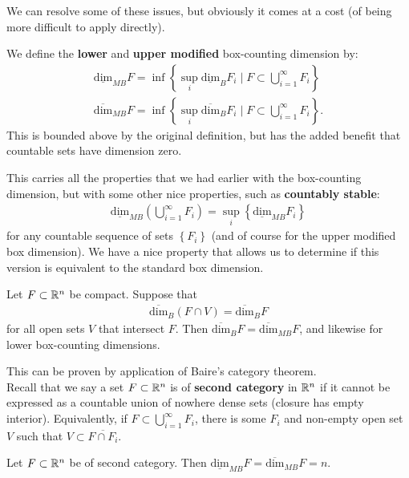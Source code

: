 \documentclass{memoir}
\begin{document}
We can resolve some of these issues, but obviously it comes at a cost (of being more difficult to apply directly).
\begin{defn}
	We define the \textbf{lower} and \textbf{upper modified} box-counting dimension by:
	\begin{align*}
		\underline{ \textrm{dim}}_{MB}F = \inf \left\{ \sup_{i} \underline{ \textrm{dim}}_B F_i \mid F\subset \bigcup_{i =1}^{\infty}F_i \right\} \\
		\overline{ \textrm{dim}}_{MB}F = \inf \left\{ \sup_{i} \overline{ \textrm{dim}}_B F_i \mid F \subset \bigcup_{i=1}^{\infty}F_i \right\} .
	\end{align*}
	This is bounded above by the original definition, but has the added benefit that countable sets have dimension zero.
\end{defn}
This carries all the properties that we had earlier with the box-counting dimension, but with some other nice properties, such as \textbf{countably stable}:
\begin{align*}
	\underline{ \textrm{dim}}_{MB} \left( \bigcup_{i =1} ^{\infty}F_i \right) = \sup_{i} \left\{ \underline{ \textrm{dim}}_{MB}F_i \right\} 
\end{align*}
for any countable sequence of sets \(\left\{ F_i \right\} \) (and of course for the upper modified box dimension). We have a nice property that allows us to determine if this version is equivalent to the standard box dimension.

\begin{prop}
	Let \(F\subset \mathbb{R}^{n}\) be compact. Suppose that
	\begin{align*}
		\overline{ \textrm{dim}}_B (F \cap V) = \overline{ \textrm{dim}}_B F
	\end{align*}
	for all open sets  \(V\) that intersect \(F\). Then \( \overline{ \textrm{dim}}_B F = \overline{ \textrm{dim}}_{MB}F\), and likewise for lower box-counting dimensions.
\end{prop}
This can be proven by application of Baire's category theorem.\\

Recall that we say a set \(F\subset \mathbb{R}^{n}\) is of \textbf{second category} in \(\mathbb{R}^{n}\) if it cannot be expressed as a countable union of nowhere dense sets (closure has empty interior). Equivalently, if \(F\subset \bigcup_{i=1}^{\infty}F_i\), there is some \(F_i\) and non-empty open set \(V\) such that \(V \subset \overline{F\cap F_i}\).

\begin{prop}
	Let \(F\subset \mathbb{R}^{n}\) be of second category. Then \( \underline{ \textrm{dim}}_{MB}F = \overline{ \textrm{dim}}_{MB}F = n\).
\end{prop}
\end{document}
